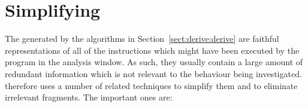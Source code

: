 \newcommand{\backref}[1]{#1}

\chapter{Simplifying {\StateMachines}}

The {\StateMachines} generated by the algorithms in
Section~\ref{sect:derive:derive} are faithful representations of all
of the instructions which might have been executed by the program in
the \backref{analysis window}.  As such, they usually contain a large
amount of redundant information which is not relevant to the behaviour
being investigated.  {\Technique} therefore uses a number of related
techniques to simplify them and to eliminate irrelevant fragments.
The important ones are:

